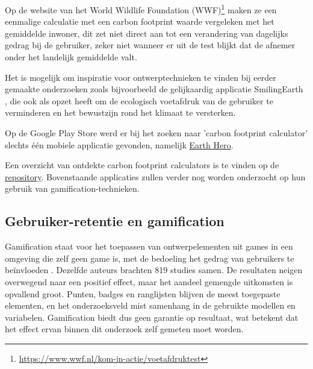 \documentclass{hogent-article}
\begin{document}
    Op de website van het World Wildlife Foundation (WWF)\footnote{\href{https://www.wwf.nl/kom-in-actie/voetafdruktest}{https://www.wwf.nl/kom-in-actie/voetafdruktest}} maken ze een eenmalige calculatie met een carbon footprint waarde vergeleken met het gemiddelde inwoner, dit zet niet direct aan tot een verandering van dagelijks gedrag bij de gebruiker, zeker niet wanneer er uit de test blijkt dat de afnemer onder het landelijk gemiddelde valt.
    
    Het is mogelijk om inspiratie voor ontwerptechnieken te vinden bij eerder gemaakte onderzoeken zoals bijvoorbeeld de gelijkaardig applicatie SmilingEarth \autocite{Petersen2020}, die ook als opzet heeft om de ecologisch voetafdruk van de gebruiker te verminderen en het bewustzijn rond het klimaat te versterken.
    
    Op de Google Play Store werd er bij het zoeken naar 'carbon footprint calculator' slechts één mobiele applicatie gevonden, namelijk \href{https://play.google.com/store/apps/details?id=com.earthheroorg.earthhero\&pcampaignid=web\_share}{Earth Hero}.
    
    Een overzicht van ontdekte carbon footprint calculators is te vinden op de \href{https://github.com/HoGentTIN/rm-25-26-groep-85/blob/main/notes/carbon-footprint.md#overzicht}{repository}. Bovenstaande applicaties zullen verder nog worden onderzocht op hun gebruik van gamification-technieken.
    
    
    \subsection{Gebruiker-retentie en gamification}
    \label{ssec:retentieengamification}
    
    Gamification staat voor het toepassen van ontwerpelementen uit games in een
    omgeving die zelf geen game is, met de bedoeling het gedrag van gebruikers te
    beïnvloeden \autocite{KoivistoHamari2019}. Dezelfde auteurs brachten 819 studies
    samen. De resultaten neigen overwegend naar een positief effect, maar het
    aandeel gemengde uitkomsten is opvallend groot. Punten, badges en ranglijsten
    blijven de meest toegepaste elementen, en het onderzoeksveld mist samenhang in
    de gebruikte modellen en variabelen. Gamification biedt dus geen garantie op
    resultaat, wat betekent dat het effect ervan binnen dit onderzoek zelf gemeten
    moet worden.
    
\end{document}
